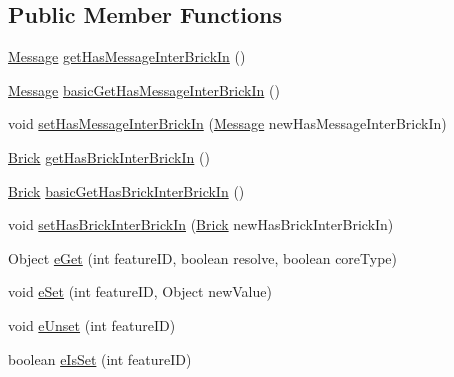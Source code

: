 \subsection*{Public Member Functions}
\begin{DoxyCompactItemize}
\item 
\hyperlink{interfaceshootingmachineemfmodel_1_1_message}{Message} \hyperlink{classshootingmachineemfmodel_1_1impl_1_1_inter_brick_in_impl_aa379228bebb5f021ecb19114f8637e3b}{get\-Has\-Message\-Inter\-Brick\-In} ()
\item 
\hyperlink{interfaceshootingmachineemfmodel_1_1_message}{Message} \hyperlink{classshootingmachineemfmodel_1_1impl_1_1_inter_brick_in_impl_af85c54e96c67d4049455f2fb1350fb45}{basic\-Get\-Has\-Message\-Inter\-Brick\-In} ()
\item 
void \hyperlink{classshootingmachineemfmodel_1_1impl_1_1_inter_brick_in_impl_ab4e713043891d5e2f9b826e4becca101}{set\-Has\-Message\-Inter\-Brick\-In} (\hyperlink{interfaceshootingmachineemfmodel_1_1_message}{Message} new\-Has\-Message\-Inter\-Brick\-In)
\item 
\hyperlink{interfaceshootingmachineemfmodel_1_1_brick}{Brick} \hyperlink{classshootingmachineemfmodel_1_1impl_1_1_inter_brick_in_impl_a25afb33543b6066eb2bfb46b037c4eb5}{get\-Has\-Brick\-Inter\-Brick\-In} ()
\item 
\hyperlink{interfaceshootingmachineemfmodel_1_1_brick}{Brick} \hyperlink{classshootingmachineemfmodel_1_1impl_1_1_inter_brick_in_impl_af76e7ea9900f498a63271a878e90db8a}{basic\-Get\-Has\-Brick\-Inter\-Brick\-In} ()
\item 
void \hyperlink{classshootingmachineemfmodel_1_1impl_1_1_inter_brick_in_impl_a17fa49bd74e9f6845378775ba1355c47}{set\-Has\-Brick\-Inter\-Brick\-In} (\hyperlink{interfaceshootingmachineemfmodel_1_1_brick}{Brick} new\-Has\-Brick\-Inter\-Brick\-In)
\item 
Object \hyperlink{classshootingmachineemfmodel_1_1impl_1_1_inter_brick_in_impl_a44ea4fed1a3e01468460eed53d11caf0}{e\-Get} (int feature\-I\-D, boolean resolve, boolean core\-Type)
\item 
void \hyperlink{classshootingmachineemfmodel_1_1impl_1_1_inter_brick_in_impl_adfd596b2401280499f4e51462ff19c23}{e\-Set} (int feature\-I\-D, Object new\-Value)
\item 
void \hyperlink{classshootingmachineemfmodel_1_1impl_1_1_inter_brick_in_impl_a46f2c36f5410b8a3e773a6867413701d}{e\-Unset} (int feature\-I\-D)
\item 
boolean \hyperlink{classshootingmachineemfmodel_1_1impl_1_1_inter_brick_in_impl_a13bc24e3d07856a0248c6e1cdadaddaa}{e\-Is\-Set} (int feature\-I\-D)
\end{DoxyCompactItemize}
